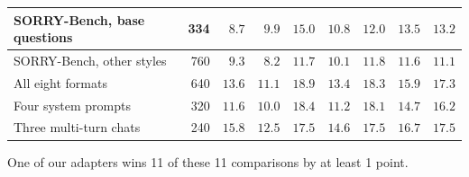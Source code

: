 \documentclass[10pt,a4paper]{article}
\begin{document}
\begin{table}[H]
\begin{tabular}{|l|r|r|r||r|r|r|r|r|}
SORRY-Bench, base questions & 334 & \cellcolor{win}$\mathbf{8.7}$ & $9.9$ & $15.0$ & $10.8$ & $12.0$ & $13.5$ & $13.2$\\\hline
SORRY-Bench, other styles & 760 & $9.3$ & \cellcolor{win}$\mathbf{8.2}$ & $11.7$ & $10.1$ & $11.8$ & $11.6$ & $11.1$\\\hline
All eight formats & 640 & $13.6$ & \cellcolor{win}$\mathbf{11.1}$ & $18.9$ & $13.4$ & $18.3$ & $15.9$ & $17.3$\\\hline
Four system prompts & 320 & $11.6$ & \cellcolor{win}$\mathbf{10.0}$ & $18.4$ & $11.2$ & $18.1$ & $14.7$ & $16.2$\\\hline
Three multi-turn chats & 240 & $15.8$ & \cellcolor{win}$\mathbf{12.5}$ & $17.5$ & $14.6$ & $17.5$ & $16.7$ & $17.5$\\\hline
\end{tabular}\end{table}
One of our adapters wins 11 of these 11 comparisons by at least 1 point.
\end{document}
